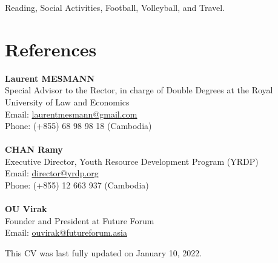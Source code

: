 \documentclass[10pt,a4paper]{article}
\begin{document}
		Reading, Social Activities, Football, Volleyball, and Travel.
								
	\vspace{-1em}
\section*{References}	
		\vspace{-0em}
		\begin{adjustwidth}{.7cm}{}
	
			\textbf{Laurent MESMANN}\\
			Special Advisor to the Rector, in charge of Double Degrees at the Royal University of Law and Economics\\
			Email: \href{mailto: laurentmesmann@gmail.com}{laurentmesmann@gmail.com}\\
			Phone: (+855) 68 98 98 18 (Cambodia)\\\\
			\textbf {CHAN Ramy}\\
			Executive Director, Youth Resource Development Program (YRDP) \\
			Email: \href{mailto: director@yrdp.org}{director@yrdp.org}\\
			Phone: (+855) 12 663 937 (Cambodia)\\\\
			\textbf{OU Virak}\\
			Founder and President at Future Forum\\
			Email: \href{mailto: ouvirak@futureforum.asia }{ouvirak@futureforum.asia}
						
		\end{adjustwidth}					
		\vspace{2em}
	
	\flushright This CV was last fully updated on January 10, 2022. 
						
\end{document}
